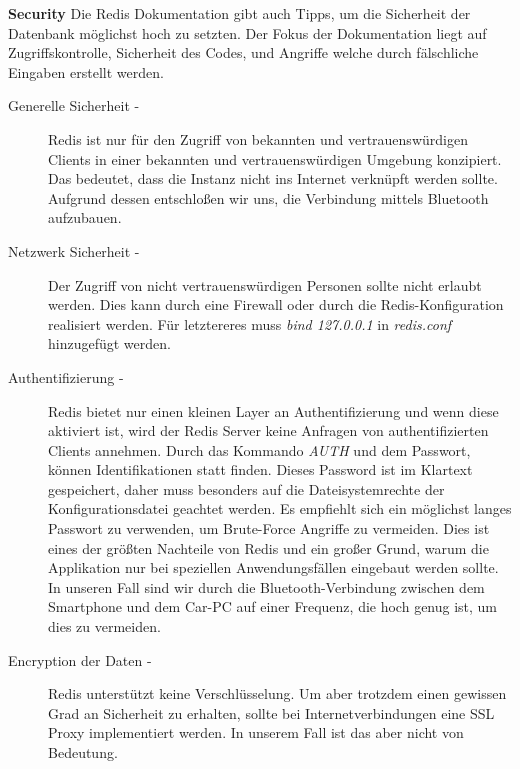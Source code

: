 \textbf{Security\newline}
Die Redis Dokumentation \cite{MELD.CH3-redis.documentation} gibt auch Tipps, um die Sicherheit der Datenbank möglichst hoch zu setzten. Der Fokus der Dokumentation liegt auf Zugriffskontrolle, Sicherheit des Codes, und Angriffe welche durch fälschliche Eingaben erstellt werden.

\begin{description}
\item[Generelle Sicherheit - \newline]
Redis ist nur für den Zugriff von bekannten und vertrauenswürdigen Clients in einer bekannten und vertrauenswürdigen Umgebung konzipiert. Das bedeutet, dass die Instanz nicht ins Internet verknüpft werden sollte. Aufgrund dessen entschloßen wir uns, die Verbindung mittels Bluetooth aufzubauen.

\item[Netzwerk Sicherheit - \newline]
Der Zugriff von nicht vertrauenswürdigen Personen sollte nicht erlaubt werden. Dies kann durch eine Firewall oder durch die Redis-Konfiguration realisiert werden. Für letztereres muss \textit{bind 127.0.0.1} in \textit{redis.conf} hinzugefügt werden.

\item[Authentifizierung - \newline]
Redis bietet nur einen kleinen Layer an Authentifizierung und wenn diese aktiviert ist, wird der Redis Server keine Anfragen von authentifizierten Clients annehmen. Durch das Kommando \textit{AUTH} und dem Passwort, können Identifikationen statt finden. Dieses Password ist im Klartext gespeichert, daher muss besonders auf die Dateisystemrechte der Konfigurationsdatei geachtet werden. Es empfiehlt sich ein möglichst langes Passwort zu verwenden, um Brute-Force Angriffe zu vermeiden. Dies ist eines der größten Nachteile von Redis und ein großer Grund, warum die Applikation nur bei speziellen Anwendungsfällen eingebaut werden sollte. In unseren Fall sind wir durch die Bluetooth-Verbindung zwischen dem Smartphone und dem Car-PC auf einer Frequenz, die hoch genug ist, um dies zu vermeiden. 

\item[Encryption der Daten - \newline]
Redis unterstützt keine Verschlüsselung. Um aber trotzdem einen gewissen Grad an Sicherheit zu erhalten, sollte bei Internetverbindungen eine SSL Proxy implementiert werden. In unserem Fall ist das aber nicht von Bedeutung.


\end{description}
